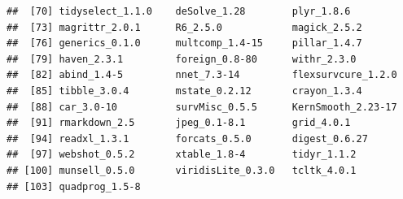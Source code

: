 \documentclass[]{article}
\begin{document}
\begin{verbatim}
##  [70] tidyselect_1.1.0    deSolve_1.28        plyr_1.8.6         
##  [73] magrittr_2.0.1      R6_2.5.0            magick_2.5.2       
##  [76] generics_0.1.0      multcomp_1.4-15     pillar_1.4.7       
##  [79] haven_2.3.1         foreign_0.8-80      withr_2.3.0        
##  [82] abind_1.4-5         nnet_7.3-14         flexsurvcure_1.2.0 
##  [85] tibble_3.0.4        mstate_0.2.12       crayon_1.3.4       
##  [88] car_3.0-10          survMisc_0.5.5      KernSmooth_2.23-17 
##  [91] rmarkdown_2.5       jpeg_0.1-8.1        grid_4.0.1         
##  [94] readxl_1.3.1        forcats_0.5.0       digest_0.6.27      
##  [97] webshot_0.5.2       xtable_1.8-4        tidyr_1.1.2        
## [100] munsell_0.5.0       viridisLite_0.3.0   tcltk_4.0.1        
## [103] quadprog_1.5-8
\end{verbatim}
\end{document}
